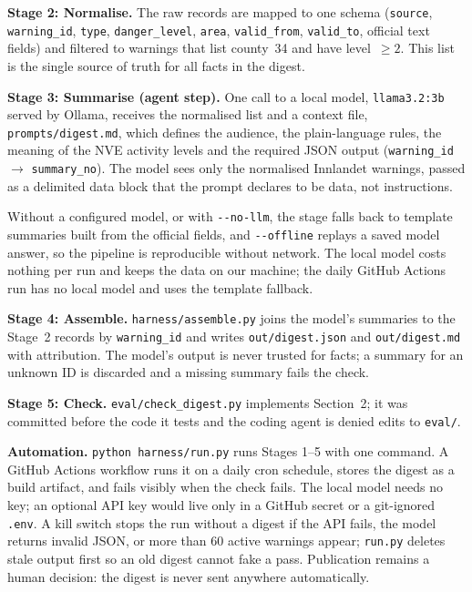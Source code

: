 \documentclass{article}
\newcommand{\code}[1]{\texttt{#1}}
\begin{document}
\textbf{Stage 2: Normalise.} The raw records are mapped to one schema (\code{source}, \code{warning\_id}, \code{type}, \code{danger\_level}, \code{area}, \code{valid\_from}, \code{valid\_to}, official text fields) and filtered to warnings that list county~34 and have level~$\geq 2$. This list is the single source of truth for all facts in the digest.

\textbf{Stage 3: Summarise (agent step).} One call to a local model, \code{llama3.2:3b} served by Ollama, receives the normalised list and a context file, \code{prompts/digest.md}, which defines the audience, the plain-language rules, the meaning of the NVE activity levels and the required JSON output (\code{warning\_id} $\rightarrow$ \code{summary\_no}). The model sees only the normalised Innlandet warnings, passed as a delimited data block that the prompt declares to be data, not instructions.

Without a configured model, or with \code{-{}-no-llm}, the stage falls back to template summaries built from the official fields, and \code{-{}-offline} replays a saved model answer, so the pipeline is reproducible without network. The local model costs nothing per run and keeps the data on our machine; the daily GitHub Actions run has no local model and uses the template fallback.

\textbf{Stage 4: Assemble.} \code{harness/assemble.py} joins the model's summaries to the Stage~2 records by \code{warning\_id} and writes \code{out/digest.json} and \code{out/digest.md} with attribution. The model's output is never trusted for facts; a summary for an unknown ID is discarded and a missing summary fails the check.

\textbf{Stage 5: Check.} \code{eval/check\_digest.py} implements Section~2; it was committed before the code it tests and the coding agent is denied edits to \code{eval/}.

\textbf{Automation.} \code{python harness/run.py} runs Stages 1--5 with one command. A GitHub Actions workflow runs it on a daily cron schedule, stores the digest as a build artifact, and fails visibly when the check fails. The local model needs no key; an optional API key would live only in a GitHub secret or a git-ignored \code{.env}. A kill switch stops the run without a digest if the API fails, the model returns invalid JSON, or more than 60 active warnings appear; \code{run.py} deletes stale output first so an old digest cannot fake a pass. Publication remains a human decision: the digest is never sent anywhere automatically.
\end{document}
